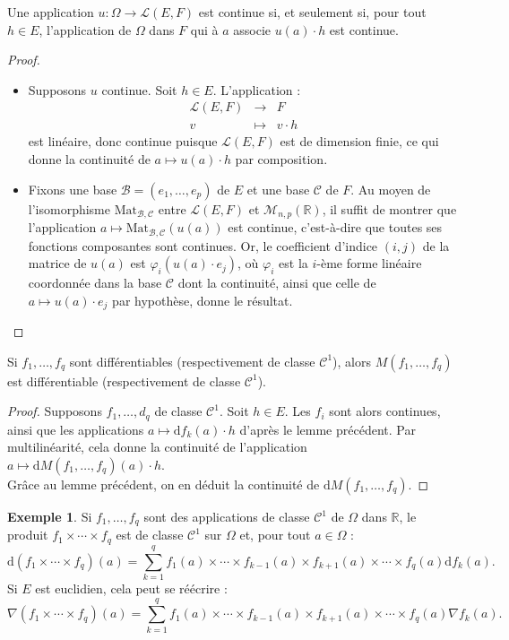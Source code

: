 \documentclass[french]{article}
\newcommand{\R}{\mathbb{R}}
\renewcommand{\d}{\text{d}}
\theoremstyle{plain}
\theoremstyle{definition}
\newtheorem*{ex}{Exemple}
\theoremstyle{remark}
\begin{document}
\begin{lem}%
	Une application $u:\Omega\to\mathcal{L}(E,F)$ est continue si, et seulement si, pour tout $h\in E$, l'application de $\Omega$ dans $F$ qui à $a$ associe $u(a)\cdot h$ est continue.
\end{lem}
\begin{proof}
	\begin{itemize}
		\item Supposons $u$ continue. Soit $h\in E$. L'application :
		$$\begin{array}{rcl}
			\mathcal{L}(E,F)&\longrightarrow&F\\
			v&\longmapsto&v\cdot h
		\end{array}$$ est linéaire, donc continue puisque $\mathcal{L}(E,F)$ est de dimension finie, ce qui donne la continuité de $a\mapsto u(a)\cdot h$ par composition.
		\item Fixons une base $\mathcal{B}=(e_1,\ldots,e_p)$ de $E$ et une base $\mathcal{C}$ de $F$. Au moyen de l'isomorphisme $\text{Mat}_{\mathcal{B},\mathcal{C}}$ entre $\mathcal{L}(E,F)$ et $\mathcal{M}_{n,p}(\R)$, il suffit de montrer que l'application $a\mapsto\text{Mat}_{\mathcal{B},\mathcal{C}}(u(a))$ est continue, c'est-à-dire que toutes ses fonctions composantes sont continues. Or, le coefficient d'indice $(i,j)$ de la matrice de $u(a)$ est $\varphi_i(u(a)\cdot e_j)$, où $\varphi_i$ est la $i$-ème forme linéaire coordonnée dans la base $\mathcal{C}$ dont la continuité, ainsi que celle de $a\mapsto u(a)\cdot e_j$ par hypothèse, donne le résultat.
	\end{itemize}
\end{proof}

\begin{cor}%
	Si $f_1,\ldots,f_q$ sont différentiables (respectivement de classe $\mathcal{C}^1$), alors $M(f_1,\ldots,f_q)$ est différentiable (respectivement de classe $\mathcal{C}^1$).
\end{cor}
\begin{proof}
	Supposons $f_1,\ldots,d_q$ de classe $\mathcal{C}^1$. Soit $h\in E$. Les $f_i$ sont alors continues, ainsi que les applications $a\mapsto \d f_k(a)\cdot h$ d'après le lemme précédent. Par multilinéarité, cela donne la continuité de l'application $a\mapsto \d M(f_1,\ldots,f_q)(a)\cdot h$.\\
	Grâce au lemme précédent, on en déduit la continuité de $\d M(f_1,\ldots,f_q)$.
\end{proof}

\begin{ex}
	Si $f_1,\ldots,f_q$ sont des applications de classe $\mathcal{C}^1$ de $\Omega$ dans $\R$, le produit $f_1\times\cdots\times f_q$ est de classe $\mathcal{C}^1$ sur $\Omega$ et, pour tout $a\in\Omega$ :
	$$\d(f_1\times\cdots\times f_q)(a)=\sum_{k=1}^{q}f_1(a)\times\cdots\times f_{k-1}(a)\times f_{k+1}(a)\times\cdots\times f_q(a)\d f_k(a).$$
	Si $E$ est euclidien, cela peut se réécrire :
	$$\nabla(f_1\times\cdots\times f_q)(a)=\sum_{k=1}^{q}f_1(a)\times\cdots\times f_{k-1}(a)\times f_{k+1}(a)\times\cdots\times f_q(a)\nabla f_k(a).$$
\end{ex}
\end{document}
